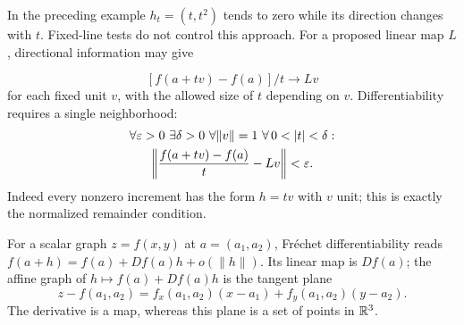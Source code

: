 In the preceding example $h_t=(t,t^2)$ tends to zero while its direction
changes with $t$. Fixed-line tests do not control this approach.
For a proposed linear map $L$, directional information may give

\[
[f(a+tv)-f(a)]/t\to Lv
\]
 for each fixed unit $v$, with the allowed size
of $t$ depending on $v$. Differentiability requires a single neighborhood:
\[
\begin{gathered}
\forall\eps>0\ \exists\delta>0\ \forall\|v\|=1\ \forall\,0<|t|<\delta:\\
\left\|\frac{f(a+tv)-f(a)}t-Lv\right\|<\eps.
\end{gathered}
\]
Indeed every nonzero increment has the form $h=tv$ with $v$ unit;
this is exactly the normalized remainder condition.


For a scalar graph $z=f(x,y)$ at $a=(a_1,a_2)$,
Fr\'echet differentiability reads
$f(a+h)=f(a)+Df(a)h+o(\|h\|)$. Its linear map is $Df(a)$;
the affine graph of $h\mapsto f(a)+Df(a)h$ is the tangent plane
\[
z-f(a_1,a_2)=f_x(a_1,a_2)(x-a_1)+f_y(a_1,a_2)(y-a_2).
\]
The derivative is a map, whereas this plane is a set of points in $\mathbb{R}^3$.

